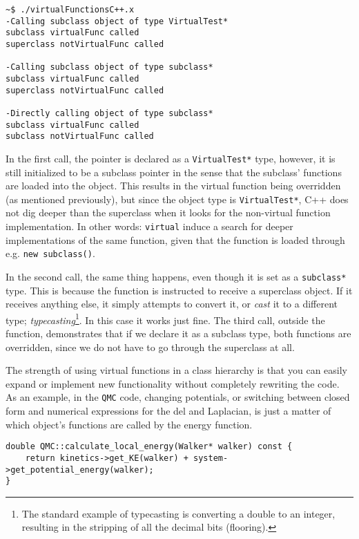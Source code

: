 \vspace{0.5 cm}


\begin{verbatim}
~$ ./virtualFunctionsC++.x 
-Calling subclass object of type VirtualTest*
subclass virtualFunc called
superclass notVirtualFunc called

-Calling subclass object of type subclass*
subclass virtualFunc called
superclass notVirtualFunc called

-Directly calling object of type subclass*
subclass virtualFunc called
subclass notVirtualFunc called
\end{verbatim}

In the first call, the pointer is declared as a \verb+VirtualTest*+ type, however, it is still initialized to be a subclass pointer in the sense that the subclass' functions are loaded into the object. This results in the virtual function being overridden (as mentioned previously), but since the object type is \verb+VirtualTest*+, C++ does not dig deeper than the superclass when it looks for the non-virtual function implementation. In other words: \verb+virtual+ induce a search for deeper implementations of the same function, given that the function is loaded through e.g. \verb+new subclass()+. 

In the second call, the same thing happens, even though it is set as a \verb+subclass*+ type. This is because the function is instructed to receive a superclass object. If it receives anything else, it simply attempts to convert it, or \textit{cast} it to a different type; \textit{typecasting}\footnote{The standard example of typecasting is converting a double to an integer, resulting in the stripping of all the decimal bits (flooring).}. In this case it works just fine. The third call, outside the function, demonstrates that if we declare it as a subclass type, both functions are overridden, since we do not have to go through the superclass at all.

The strength of using virtual functions in a class hierarchy is that you can easily expand or implement new functionality without completely rewriting the code. As an example, in the \verb+QMC+ code, changing potentials, or switching between closed form and numerical expressions for the del and Laplacian, is just a matter of which object's functions are called by the energy function.

\vspace{0.5 cm}
\begin{lstlisting}
double QMC::calculate_local_energy(Walker* walker) const {
    return kinetics->get_KE(walker) + system->get_potential_energy(walker);
}
\end{lstlisting}

